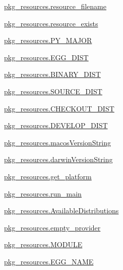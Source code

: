 \begin{DoxyCompactItemize}
\item 
\hyperlink{namespacepkg__resources_a4d232c3e3dfb85fb17099b9d156df66f}{pkg\+\_\+resources.\+resource\+\_\+filename}
\item 
\hyperlink{namespacepkg__resources_a52c1ee536d5f0602a4dfbfb43a506fae}{pkg\+\_\+resources.\+resource\+\_\+exists}
\item 
\hyperlink{namespacepkg__resources_a27901fd744697f2b2d55b6f1255cf020}{pkg\+\_\+resources.\+P\+Y\+\_\+\+M\+A\+J\+OR}
\item 
\hyperlink{namespacepkg__resources_a5a0f6c722896ed99cec71096149b840f}{pkg\+\_\+resources.\+E\+G\+G\+\_\+\+D\+I\+ST}
\item 
\hyperlink{namespacepkg__resources_ac0716f771522a1d2e9153c5d4b3ae624}{pkg\+\_\+resources.\+B\+I\+N\+A\+R\+Y\+\_\+\+D\+I\+ST}
\item 
\hyperlink{namespacepkg__resources_aefc29304b85a2e7e1412e963e7e26b68}{pkg\+\_\+resources.\+S\+O\+U\+R\+C\+E\+\_\+\+D\+I\+ST}
\item 
\hyperlink{namespacepkg__resources_aa866ea6cfcd7406355f9ae7d8a072fef}{pkg\+\_\+resources.\+C\+H\+E\+C\+K\+O\+U\+T\+\_\+\+D\+I\+ST}
\item 
\hyperlink{namespacepkg__resources_a3accd16ac53c67f4af30a22c9f17cabf}{pkg\+\_\+resources.\+D\+E\+V\+E\+L\+O\+P\+\_\+\+D\+I\+ST}
\item 
\hyperlink{namespacepkg__resources_a3695a1e24be4d45381a48809b15e13d1}{pkg\+\_\+resources.\+macos\+Version\+String}
\item 
\hyperlink{namespacepkg__resources_aa2d17171c1a4bc937a48907c530f76ae}{pkg\+\_\+resources.\+darwin\+Version\+String}
\item 
\hyperlink{namespacepkg__resources_aed6997ba900a5733dcb3ebe4492eaa83}{pkg\+\_\+resources.\+get\+\_\+platform}
\item 
\hyperlink{namespacepkg__resources_a49c454f5d7f8e48dea964b635ff91968}{pkg\+\_\+resources.\+run\+\_\+main}
\item 
\hyperlink{namespacepkg__resources_ab2650bbd95cc1c4076b7853c43c97cf9}{pkg\+\_\+resources.\+Available\+Distributions}
\item 
\hyperlink{namespacepkg__resources_ad4a5f62f100fdb128f15480d4fd2f007}{pkg\+\_\+resources.\+empty\+\_\+provider}
\item 
\hyperlink{namespacepkg__resources_a084f41f0d9228b901649251a09c6cbdf}{pkg\+\_\+resources.\+M\+O\+D\+U\+LE}
\item 
\hyperlink{namespacepkg__resources_a1971b341425adaa3e52d5572f7240d8e}{pkg\+\_\+resources.\+E\+G\+G\+\_\+\+N\+A\+ME}
\end{DoxyCompactItemize}
